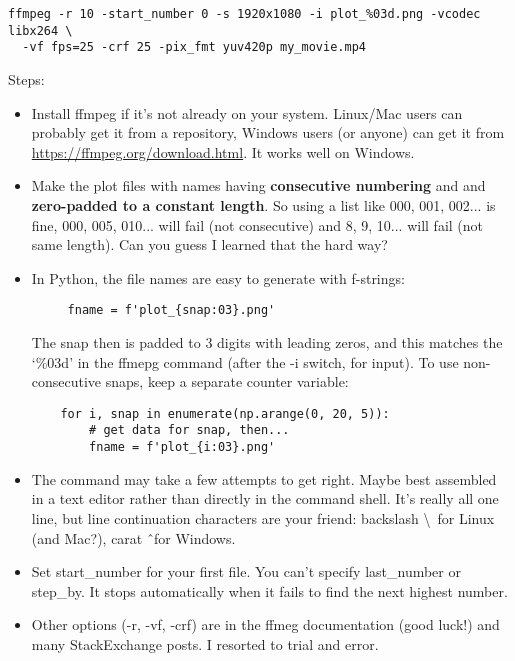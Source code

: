 
\lstset{style=py} 
\begin{lstlisting}
ffmpeg -r 10 -start_number 0 -s 1920x1080 -i plot_%03d.png -vcodec libx264 \
  -vf fps=25 -crf 25 -pix_fmt yuv420p my_movie.mp4
\end{lstlisting}

Steps:

\begin{itemize}
	\item Install ffmpeg if it's not already on your system. Linux/Mac users can probably get it from a repository, Windows users (or anyone) can get it from \url{https://ffmpeg.org/download.html}. It works well on Windows.
	\item Make the plot files with names having \textbf{consecutive numbering} and and \textbf{zero-padded to a constant length}. So using a list like 000, 001, 002... is fine, 000, 005, 010... will fail (not consecutive) and 8, 9, 10... will fail (not same length). Can you guess I learned that the hard way? 
	\item In Python, the file names are easy to generate with f-strings:
	\begin{lstlisting}
	 fname = f'plot_{snap:03}.png'
	\end{lstlisting}
	The snap then is padded to 3 digits with leading zeros, and this matches the `\%03d' in the ffmepg command (after the -i switch, for input). To use non-consecutive snaps, keep a separate counter variable:
	\begin{lstlisting}
	for i, snap in enumerate(np.arange(0, 20, 5)):
		# get data for snap, then...
		fname = f'plot_{i:03}.png'	
	\end{lstlisting}
	
	\item The command may take a few attempts to get right. Maybe best assembled in a text editor rather than directly in the command shell. It's really all one line, but line continuation characters are your friend: backslash \textbackslash\ for Linux (and Mac?), carat \^\ for Windows.
	\item Set start\_number for your first file. You can't specify last\_number or step\_by. It stops automatically when it fails to find the next highest number.
	\item Other options (-r, -vf, -crf) are in the ffmeg documentation (good luck!) and many StackExchange posts. I resorted to trial and error.
\end{itemize}

